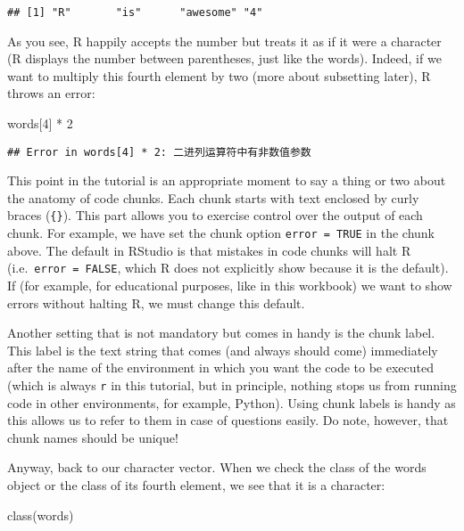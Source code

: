 \documentclass[
]{article}
\newenvironment{Shaded}{\begin{snugshade}}{\end{snugshade}}
\newcommand{\DecValTok}[1]{\textcolor[rgb]{0.00,0.00,0.81}{#1}}
\newcommand{\FunctionTok}[1]{\textcolor[rgb]{0.00,0.00,0.00}{#1}}
\newcommand{\NormalTok}[1]{#1}
\newcommand{\SpecialCharTok}[1]{\textcolor[rgb]{0.00,0.00,0.00}{#1}}
\begin{document}
\begin{verbatim}
## [1] "R"       "is"      "awesome" "4"
\end{verbatim}

As you see, R happily accepts the number but treats it as if it were a
character (R displays the number between parentheses, just like the
words). Indeed, if we want to multiply this fourth element by two (more
about subsetting later), R throws an error:

\begin{Shaded}
\begin{Highlighting}[]
\NormalTok{words[}\DecValTok{4}\NormalTok{] }\SpecialCharTok{*} \DecValTok{2}
\end{Highlighting}
\end{Shaded}

\begin{verbatim}
## Error in words[4] * 2: 二进列运算符中有非数值参数
\end{verbatim}

This point in the tutorial is an appropriate moment to say a thing or
two about the anatomy of code chunks. Each chunk starts with text
enclosed by curly braces (\texttt{\{\}}). This part allows you to
exercise control over the output of each chunk. For example, we have set
the chunk option \texttt{error\ =\ TRUE} in the chunk above. The default
in RStudio is that mistakes in code chunks will halt R
(i.e.~\texttt{error\ =\ FALSE}, which R does not explicitly show because
it is the default). If (for example, for educational purposes, like in
this workbook) we want to show errors without halting R, we must change
this default.

Another setting that is not mandatory but comes in handy is the chunk
label. This label is the text string that comes (and always should come)
immediately after the name of the environment in which you want the code
to be executed (which is always \texttt{r} in this tutorial, but in
principle, nothing stops us from running code in other environments, for
example, Python). Using chunk labels is handy as this allows us to refer
to them in case of questions easily. Do note, however, that chunk names
should be unique!

Anyway, back to our character vector. When we check the class of the
words object or the class of its fourth element, we see that it is a
character:

\begin{Shaded}
\begin{Highlighting}[]
\FunctionTok{class}\NormalTok{(words)}
\end{Highlighting}
\end{Shaded}
\end{document}
